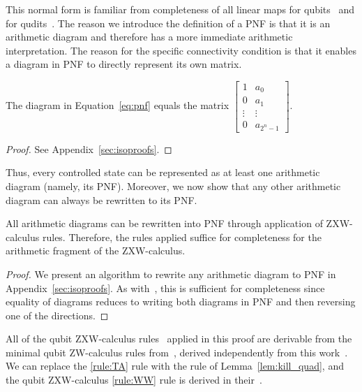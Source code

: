 This normal form is familiar from completeness of all linear maps for qubits~\cite{Hadzihasanovic2018zwzxcomplete} and for qudits~\cite{poor2023completeness}. The reason we introduce the definition of a PNF is that it is an arithmetic diagram and therefore has a more immediate arithmetic interpretation. The reason for the specific connectivity condition is that it enables a diagram in PNF to directly represent its own matrix.

\begin{prop}\label{prop:vec_pnf}
The diagram in Equation~\eqref{eq:pnf} equals the matrix
    $\begin{bmatrix}
            1 &  a_0 \\ 0 & a_1 \\ \vdots & \vdots \\ 0 & a_{2^n-1}
        \end{bmatrix}$.
\end{prop} 

\begin{proof}
    See Appendix~\ref{sec:isoproofs}.
\end{proof}

Thus, every controlled state can be represented as at least one arithmetic diagram (namely, its PNF). Moreover, we now show that any other arithmetic diagram can always be rewritten to its PNF.


\begin{thm}\label{thm:uni_pnf}
    All arithmetic diagrams can be rewritten into PNF through application of ZXW-calculus rules. Therefore, the rules applied suffice for completeness for the arithmetic fragment of the ZXW-calculus.
\end{thm}

\begin{proof}
    We present an algorithm to rewrite any arithmetic diagram to PNF in Appendix~\ref{sec:isoproofs}. As with~\cite{poor2023completeness}, this is sufficient for completeness since equality of diagrams reduces to writing both diagrams in PNF and then reversing one of the directions.
\end{proof}
\begin{remark}\label{remark:minZW}
    All of the qubit ZXW-calculus rules~\cite{poor2023completeness} applied in this proof are derivable from the minimal qubit ZW-calculus rules from~\cite{deVisme2025minzw}, derived independently from this work~\cite{Agnew2023Masters}. We can replace the \ref{rule:TA} rule with the rule of Lemma~\ref{lem:kill_quad}, and the qubit ZXW-calculus \ref{rule:WW} rule is derived in their~\cite[Lemma 23]{deVisme2025minzw}.
\end{remark}

